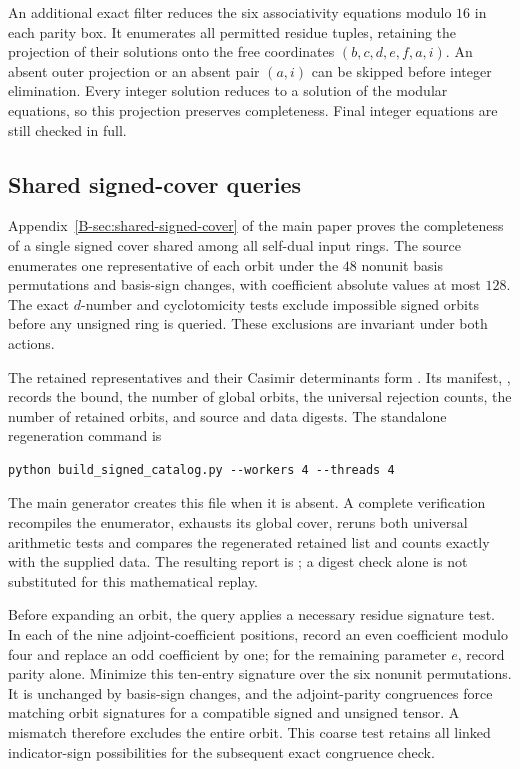 \documentclass[11pt]{article}
\begin{document}
An additional exact filter reduces the six associativity equations
modulo $16$ in each parity box. It enumerates all permitted residue
tuples, retaining the projection of their solutions onto the free
coordinates $(b,c,d,e,f,a,i)$. An absent outer projection or an absent
pair $(a,i)$ can be skipped before integer elimination. Every integer
solution reduces to a solution of the modular equations, so this
projection preserves completeness. Final integer equations are still
checked in full.

\subsection{Shared signed-cover queries}
Appendix~\ref{B-sec:shared-signed-cover} of the main paper proves the
completeness of a single signed cover shared among all self-dual input
rings. The source  enumerates
one representative of each orbit under the $48$ nonunit basis
permutations and basis-sign changes, with coefficient absolute values
at most $128$. The exact $d$-number and cyclotomicity tests exclude
impossible signed orbits before any unsigned ring is queried.
These exclusions are invariant under both actions.

The retained representatives and their Casimir determinants form
. Its manifest,
, records the bound,
the number of global orbits, the universal rejection counts, the
number of retained orbits, and source and data digests. The standalone
regeneration command is
\begin{verbatim}
python build_signed_catalog.py --workers 4 --threads 4
\end{verbatim}
The main generator creates this file when it is absent. A complete
verification recompiles the enumerator, exhausts its global cover,
reruns both universal arithmetic tests and compares the regenerated
retained list and counts exactly with the supplied data. The resulting
report is ; a digest
check alone is not substituted for this mathematical replay.

Before expanding an orbit, the query applies a necessary residue
signature test. In each of the nine adjoint-coefficient positions,
record an even coefficient modulo four and replace an odd coefficient
by one; for the remaining parameter $e$, record parity alone.
Minimize this ten-entry signature over the six nonunit permutations.
It is unchanged by basis-sign changes, and the adjoint-parity
congruences force matching orbit signatures for a compatible signed
and unsigned tensor. A mismatch therefore excludes the entire orbit.
This coarse test retains all linked indicator-sign possibilities for
the subsequent exact congruence check.
\end{document}
